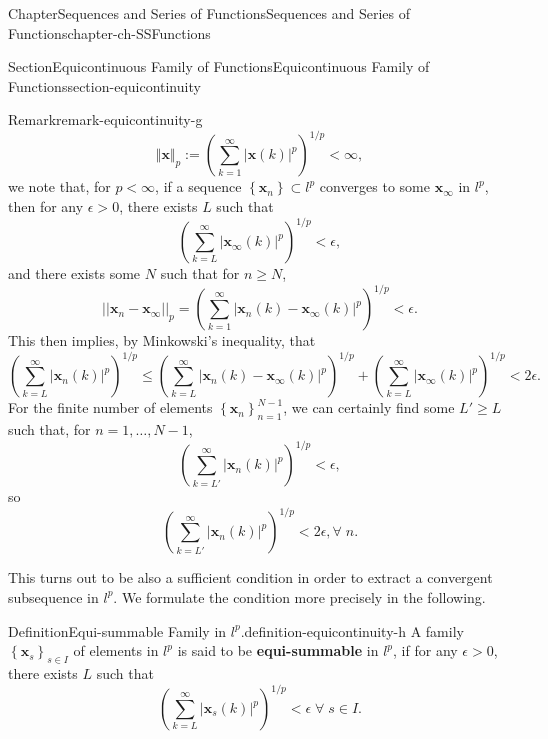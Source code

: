 \documentclass[oneside,10pt,]{book}
\newcommand{\terminology}[1]{\textbf{#1}}
\numberwithin{equation}{section}
\begin{document}
\begin{chapterptx}{Chapter}{Sequences and Series of Functions}{}{Sequences and Series of Functions}{}{}{chapter-ch-SSFunctions}
\begin{sectionptx}{Section}{Equicontinuous Family of Functions}{}{Equicontinuous Family of Functions}{}{}{section-equicontinuity}
\begin{remark}{Remark}{}{remark-equicontinuity-g}
\begin{equation*}
\Vert \mathbf x\Vert_{p} :=\left(\sum_{k=1}^{\infty} |\mathbf x(k)|^{p}\right)^{1/p} < \infty,
\end{equation*}
we note that, for \(p < \infty\), if a sequence \(\left\{{\mathbf x}_{n}\right\} \subset l^{p}\) converges to some \({\mathbf x}_{\infty}\)  in \(l^{p} \), then for any \(\epsilon >0\), there exists \(L\) such that%
\begin{equation*}
\left(\sum_{k=L}^{\infty} |{\mathbf x}_{\infty}(k)|^{p} \right)^{1/p} < \epsilon,
\end{equation*}
and there exists some \(N\) such that for \(n\ge N\),%
\begin{equation*}
||{\mathbf x}_{n}-{\mathbf x}_{\infty}||_{p}= \left(\sum_{k=1}^{\infty} |{\mathbf x}_{n}(k)-{\mathbf x}_{\infty}(k)|^{p} \right)^{1/p} < \epsilon.
\end{equation*}
This then implies, by Minkowski's inequality, that%
\begin{equation*}
\left(\sum_{k=L}^{\infty} |{\mathbf x}_{n}(k)|^{p} \right)^{1/p}
\le \left(\sum_{k=L}^{\infty} |{\mathbf x}_{n}(k)-{\mathbf x}_{\infty}(k)|^{p} \right)^{1/p} +
\left(\sum_{k=L}^{\infty} |{\mathbf x}_{\infty}(k)|^{p} \right)^{1/p} < 2\epsilon.
\end{equation*}
For the finite number of elements \(\left\{{\mathbf x}_{n}\right\}_{n=1}^{N-1}\), we can certainly find some \(L' \ge L\) such that, for \(n=1, \ldots, N-1\),%
\begin{equation*}
\left(\sum_{k=L'}^{\infty} |{\mathbf x}_{n}(k)|^{p} \right)^{1/p} < \epsilon,
\end{equation*}
so%
\begin{equation*}
\left(\sum_{k=L'}^{\infty} |{\mathbf x}_{n}(k)|^{p} \right)^{1/p} < 2\epsilon, \forall \;n.
\end{equation*}
%
\par
This turns out to be also a sufficient condition in order to extract a convergent subsequence in \(l^{p}\). We formulate the condition more precisely in the following.%
\end{remark}
\begin{definition}{Definition}{Equi-summable Family in \(l^{p}\).}{definition-equicontinuity-h}%
A family \(\left\{{\mathbf x}_{s}\right\}_{s\in I}\) of elements in \(l^{p}\) is said to be \terminology{equi-summable} in \(l^{p}\), if for any \(\epsilon >0\), there exists \(L\) such that%
\begin{equation}
\left(\sum_{k=L}^{\infty} |{\mathbf x}_{s}(k)|^{p} \right)^{1/p} < \epsilon \; \forall \; s\in I.\label{men-eqsm}

\end{equation}
\end{definition}
\end{sectionptx}
\end{chapterptx}
\end{document}
